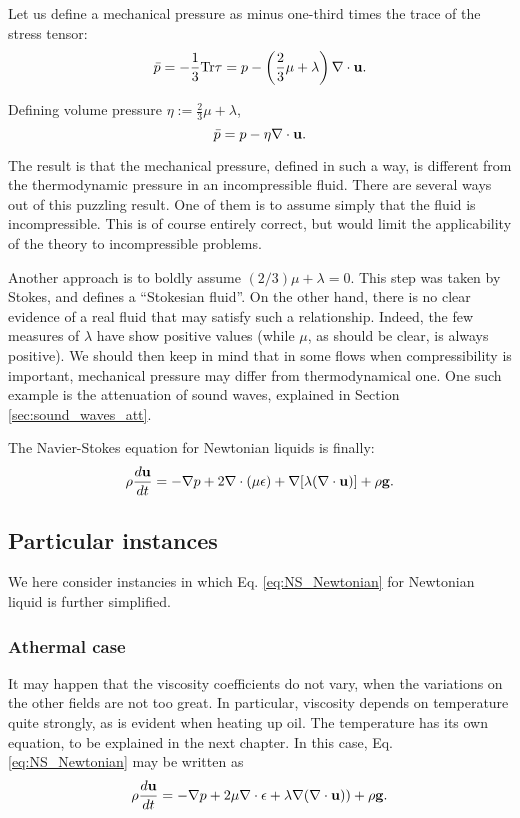 Let us define a mechanical pressure as minus one-third times the trace
of the stress tensor:
\[
\bar{p}=
-\frac13 \mathrm{Tr} \tau = 
 p
- \left( \frac23 \mu  + \lambda \right) \nabla\cdot \mathbf{u} .
\]

Defining volume pressure $\eta:=\frac23 \mu  + \lambda$,
\[
  \bar{p}=
  p - \eta \nabla\cdot \mathbf{u} .
\]


The result is that the mechanical pressure, defined in such a way, is
different from the thermodynamic pressure in an incompressible fluid.
There are several ways out of this puzzling result. One of them is to
assume simply that the fluid is incompressible. This is of course
entirely correct, but would limit the applicability of the theory to
incompressible problems.

Another approach is to boldly assume $( 2/3 ) \mu+\lambda=0$. This
step was taken by Stokes, and defines a ``Stokesian fluid''. On the
other hand, there is no clear evidence of a real fluid that may
satisfy such a relationship. Indeed, the few measures of $\lambda$
have show positive values (while $\mu$, as should be clear, is always
positive). We should then keep in mind that in some flows when
compressibility is important, mechanical pressure may differ from
thermodynamical one. One such example is the attenuation of sound
waves, explained in Section \ref{sec:sound_waves_att}.

The Navier-Stokes equation for Newtonian liquids is finally:
\begin{equation}
  \label{eq:NS_Newtonian}
  \rho \frac{d\mathbf{u} }{dt} =
  - \nabla p +
  2 \nabla \cdot ( \mu \epsilon)
  + \nabla [ \lambda ( \nabla\cdot\mathbf{u} ) ]
  + \rho \mathbf{g} .
\end{equation}

\subsection{Particular instances}

We here consider instancies in which Eq. \ref{eq:NS_Newtonian} for
Newtonian liquid is further simplified.


\subsubsection{Athermal case}

It may happen that the viscosity coefficients do not vary, when the
variations on the other fields are not too great. In particular,
viscosity depends on temperature quite strongly, as is evident when
heating up oil. The temperature has its own equation, to be explained
in the next chapter. In this case, Eq. \ref{eq:NS_Newtonian} may be
written as
\begin{equation*}
  \rho \frac{d\mathbf{u} }{dt} =
  - \nabla p +
   2 \mu \nabla \cdot  \epsilon
  + \lambda \nabla ( \nabla\cdot\mathbf{u} ) )
  + \rho \mathbf{g} .
\end{equation*}


